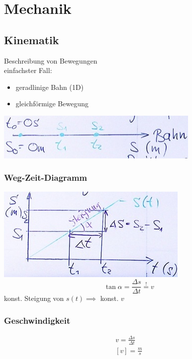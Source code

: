 \chapter{Mechanik}

\section{Kinematik}
Beschreibung von Bewegungen \\
einfachster Fall:
\begin{itemize}
	\item geradlinige Bahn (1D)
	\item gleichförmige Bewegung
\end{itemize}
\includegraphics{Bild1}

\subsection{Weg-Zeit-Diagramm}
\includegraphics{Bild2}
\[ \tan \alpha = \frac{\Delta s}{\Delta t} \overset{!}{=} v \]
konst. Steigung von $s(t) \implies$ konst. $v$

\subsection{Geschwindigkeit}
\begin{def*}[ note = Geschwindigkeit , index = Geschwindigkeit ]
	\begin{gather*}
		v = \frac{\Delta s}{\Delta t} \\
		[v] = \frac{m}{s}
	\end{gather*}
\end{def*}

